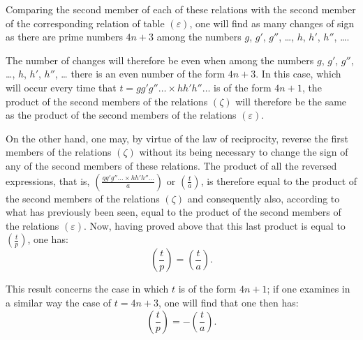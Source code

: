 \documentclass[11pt]{article}
\newcommand{\leg}[2]{\left(\frac{#1}{#2}\right)}
\newcommand{\unitid}[1]{\hypertarget{#1}{}}
\begin{document}
\unitid{dirichlet.v1.p04b.en.par.024}Comparing the second member of each of these relations with the second member of the corresponding relation of table $(\varepsilon)$, one will find as many changes of sign as there are prime numbers $4n+3$ among the numbers $g$, $g'$, $g''$, \ldots{}, $h$, $h'$, $h''$, \ldots{}.

\unitid{dirichlet.v1.p04b.en.par.025}The number of changes will therefore be even when among the numbers $g$, $g'$, $g''$, \ldots{}, $h$, $h'$, $h''$, \ldots{} there is an even number of the form $4n+3$. In this case, which will occur every time that $t=gg'g''\ldots{}\times hh'h''\ldots$ is of the form $4n+1$, the product of the second members of the relations $(\zeta)$ will therefore be the same as the product of the second members of the relations $(\varepsilon)$.

\unitid{dirichlet.v1.p04b.en.par.026}On the other hand, one may, by virtue of the law of reciprocity, reverse the first members of the relations $(\zeta)$ without its being necessary to change the sign of any of the second members of these relations. The product of all the reversed expressions, that is, $\leg{gg'g''\ldots{}\times hh'h''\ldots}{a}$ or $\leg{t}{a}$, is therefore equal to the product of the second members of the relations $(\zeta)$ and consequently also, according to what has previously been seen, equal to the product of the second members of the relations $(\varepsilon)$. Now, having proved above that this last product is equal to $\leg{t}{p}$, one has:
\unitid{dirichlet.v1.p04b.en.eq.020}
\[
\leg{t}{p}=\leg{t}{a}.
\]

\unitid{dirichlet.v1.p04b.en.par.027}This result concerns the case in which $t$ is of the form $4n+1$; if one examines in a similar way the case of $t=4n+3$, one will find that one then has:
\unitid{dirichlet.v1.p04b.en.eq.021}
\[
\leg{t}{p}=-\leg{t}{a}.
\]
\end{document}
